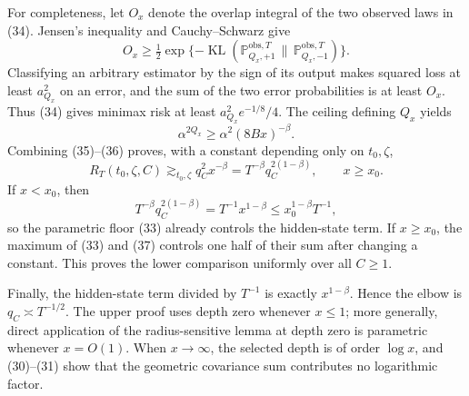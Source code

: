 For completeness, let \(O_x\) denote the overlap integral of the two observed
laws in (34).  Jensen's inequality and Cauchy--Schwarz give
\[
 O_x\ge\tfrac12\exp\{-\operatorname{KL}(\mathbb P_{Q_x,+1}^{\mathrm{obs},T}\,\|\,
                                             \mathbb P_{Q_x,-1}^{\mathrm{obs},T})\}.
\]
Classifying an arbitrary estimator by the sign of its output makes squared
loss at least \(a_{Q_x}^2\) on an error, and the sum of the two error
probabilities is at least \(O_x\).  Thus (34) gives minimax risk at least
\(a_{Q_x}^2e^{-1/8}/4\).  The ceiling defining \(Q_x\) yields
\[
 \alpha^{2Q_x}\ge\alpha^2(8Bx)^{-\beta}. \tag{36}
\]
Combining (35)--(36) proves, with a constant depending only on
\(t_0,\zeta\),
\[
 R_T(t_0,\zeta,C)
 \gtrsim_{t_0,\zeta}q_C^2x^{-\beta}
 =T^{-\beta}q_C^{2(1-\beta)},
 \qquad x\ge x_0. \tag{37}
\]
If \(x<x_0\), then
\[
 T^{-\beta}q_C^{2(1-\beta)}
 =T^{-1}x^{1-\beta}
 \le x_0^{1-\beta}T^{-1},
\]
so the parametric floor (33) already controls the hidden-state term.  If
\(x\ge x_0\), the maximum of (33) and (37) controls one half of their sum
after changing a constant.  This proves the lower comparison uniformly over
all \(C\ge1\).

Finally, the hidden-state term divided by \(T^{-1}\) is exactly
\(x^{1-\beta}\).  Hence the elbow is \(q_C\asymp T^{-1/2}\).  The upper proof
uses depth zero whenever \(x\le1\); more generally, direct application of the
radius-sensitive lemma at depth zero is parametric whenever \(x=O(1)\).
When \(x\to\infty\), the selected depth is of order \(\log x\), and
(30)--(31) show that the geometric covariance sum contributes no logarithmic
factor.

